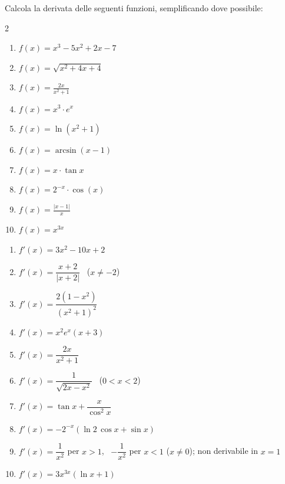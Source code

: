 \begin{question}[ID=1.1, subtitle={Calcolo di derivate — serie 1}, tags={derivate, calcolo}, difficulty=media]
Calcola la derivata delle seguenti funzioni, semplificando dove possibile:
\begin{center}\begin{minipage}{0.92\linewidth}
\begin{multicols}{2}
\begin{enumerate}[label=\arabic*),leftmargin=3.2cm]
\item $f(x) = x^3 - 5x^2 + 2x - 7$
\item $f(x) = \sqrt{x^2 + 4x + 4}$
\item $f(x) = \frac{2x}{x^2 + 1}$
\item $f(x) = x^3 \cdot e^x$
\item $f(x) = \ln(x^2 + 1)$
\item $f(x) = \arcsin(x-1)$
\item $f(x) = x \cdot \tan x$
\item $f(x) = 2^{-x} \cdot \cos(x)$
\item $f(x) = \frac{|x - 1|}{x}$
\item $f(x) = x^{3x}$
\end{enumerate}
\end{multicols}
\end{minipage}\end{center}
\begin{solution}
\begin{enumerate}[label=\arabic*)]
    \item $f'(x)=3x^2-10x+2$
    \item $f'(x)=\dfrac{x+2}{|x+2|}$ \ ($x\neq-2$)
    \item $f'(x)=\dfrac{2(1-x^2)}{(x^2+1)^2}$
    \item $f'(x)=x^2e^x(x+3)$
    \item $f'(x)=\dfrac{2x}{x^2+1}$
    \item $f'(x)=\dfrac{1}{\sqrt{2x-x^2}}$ \ ($0<x<2$)
    \item $f'(x)=\tan x+\dfrac{x}{\cos^2x}$
    \item $f'(x)=-2^{-x}(\ln2\,\cos x+\sin x)$
    \item $f'(x)=\dfrac1{x^2}$ per $x>1$, \ $-\dfrac1{x^2}$ per $x<1$ ($x\neq0$); non derivabile in $x=1$
    \item $f'(x)=3x^{3x}(\ln x+1)$
\end{enumerate}
\end{solution}
\begin{explanation}

\end{explanation}
\end{question}
